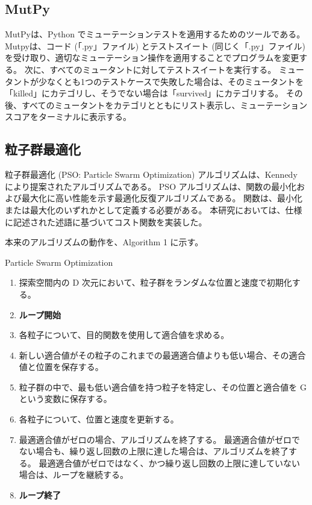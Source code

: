 \documentclass[uplatex, twocolumn, 10pt]{jsarticle} %
\begin{document}
\subsection{MutPy}
MutPyは、Python でミューテーションテストを適用するためのツールである。
Mutpyは、コード (「.py」ファイル) とテストスイート (同じく「.py」ファイル) を受け取り、適切なミューテーション操作を適用することでプログラムを変更する。
次に、すべてのミュータントに対してテストスイートを実行する。
ミュータントが少なくとも1つのテストケースで失敗した場合は、そのミュータントを「killed」にカテゴリし、そうでない場合は「survived」にカテゴリする。
その後、すべてのミュータントをカテゴリとともにリスト表示し、ミューテーションスコアをターミナルに表示する。

\subsection{粒子群最適化}
粒子群最適化 (PSO: Particle Swarm Optimization) アルゴリズムは、Kennedy により提案されたアルゴリズムである\cite{7}。
PSO アルゴリズムは、関数の最小化および最大化に高い性能を示す最適化反復アルゴリズムである。
関数は、最小化または最大化のいずれかとして定義する必要がある。
本研究においては、仕様に記述された述語に基づいてコスト関数を実装した。

本来のアルゴリズムの動作を、Algorithm 1 に示す。

\begin{algorithm}[tp]
    \caption{Particle Swarm Optimization}
    \begin{enumerate}
        \item 探索空間内の D 次元において、粒子群をランダムな位置と速度で初期化する。\\
        \item \textbf{ループ開始}\\
        \item 各粒子について、目的関数を使用して適合値を求める。\\
        \item 新しい適合値がその粒子のこれまでの最適適合値よりも低い場合、その適合値と位置を保存する。\\
        \item 粒子群の中で、最も低い適合値を持つ粒子を特定し、その位置と適合値を G という変数に保存する。\\
        \item 各粒子について、位置と速度を更新する。\\
        \item 最適適合値がゼロの場合、アルゴリズムを終了する。
              最適適合値がゼロでない場合も、繰り返し回数の上限に達した場合は、アルゴリズムを終了する。
              最適適合値がゼロではなく、かつ繰り返し回数の上限に達していない場合は、ループを継続する。\\
        \item \textbf{ループ終了}
    \end{enumerate}
\end{algorithm}
\end{document}
